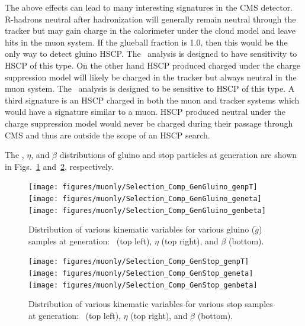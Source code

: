 The above effects can lead to many interesting signatures in the CMS detector. R-hadrons neutral after hadronization will generally remain neutral through the tracker
but may gain charge in the calorimeter under the cloud model and leave hits in the muon system. If the glueball fraction is 1.0, then this would
be the only way to detect gluino HSCP. The \muononly\ analysis is designed to have sensitivity to HSCP of this type. On the other hand HSCP produced charged under
the charge suppression model will likely be charged in the tracker but always neutral in the muon system. The \tkonly\ analysis is designed to be sensitive
to HSCP of this type. A third signature is an HSCP charged in both the muon and tracker systems which would have a signature similar to a muon.
HSCP produced neutral under the charge suppression model would never be charged during their passage through CMS and thus are outside the scope
of an HSCP search.%

The \pt, $\eta$, and $\beta$ distributions of gluino and stop particles at generation are shown in Figs.~\ref{fig:GenGluino} and~\ref{fig:GenStop}, respectively.

\begin{figure}
 \begin{center}
  \texttt{[image: figures/muonly/Selection\_Comp\_GenGluino\_genpT]}
  \texttt{[image: figures/muonly/Selection\_Comp\_GenGluino\_geneta]}
  \texttt{[image: figures/muonly/Selection\_Comp\_GenGluino\_genbeta]}
 \end{center}
 \caption[Distribution of \pt, $\eta$, and $\beta$ for various gluino samples at generation]
{Distribution of various kinematic variables for various gluino ($\tilde{g}$) samples at generation:
\pt\ (top left), $\eta$ (top right), and $\beta$ (bottom).
   \label{fig:GenGluino}}
\end{figure}

\begin{figure}
 \begin{center}
  \texttt{[image: figures/muonly/Selection\_Comp\_GenStop\_genpT]}
  \texttt{[image: figures/muonly/Selection\_Comp\_GenStop\_geneta]}
  \texttt{[image: figures/muonly/Selection\_Comp\_GenStop\_genbeta]}
 \end{center}
 \caption[Distribution of \pt, $\eta$, and $\beta$ for various stop ($\tilde{t}$) samples at generation]
{Distribution of various kinematic variables for various stop samples at generation:
\pt\ (top left), $\eta$ (top right), and $\beta$ (bottom).
   \label{fig:GenStop}}
\end{figure}

